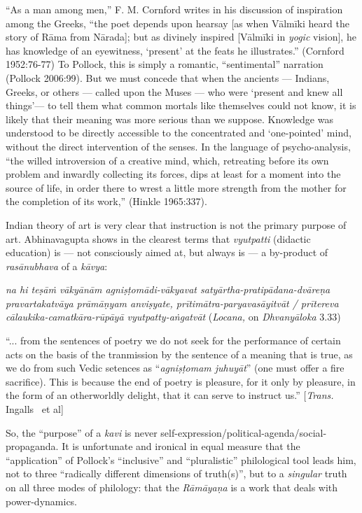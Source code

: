 “As a man among men,” F. M. Cornford writes in his discussion of inspiration among the Greeks, “the poet depends upon hearsay [as when Vālmīki heard the story of Rāma from Nārada]; but as divinely inspired [Vālmīki in {\sl yogic} vision], he has knowledge of an eyewitness, ‘present’ at the feats he illustrates.” (Cornford 1952:76-77) To Pollock, this is simply a romantic, “sentimental” narration (Pollock 2006:99). But we must concede that when the ancients — Indians, Greeks, or others — called upon the Muses — who were ‘present and knew all things’— to tell them what common mortals like themselves could not know, it is likely that their meaning was more serious than we suppose. Knowledge was understood to be directly accessible to the concentrated and ‘one-pointed’ mind, without the direct intervention of the senses. In the language of psycho-analysis,  “the willed introversion of a creative mind, which, retreating before its own problem and inwardly collecting its forces, dips at least for a moment into the source of life, in order there to wrest a little more strength from the mother for the completion of its work,” (Hinkle 1965:337). 

Indian theory of art is very clear that instruction is not the primary purpose of art. Abhinavagupta shows in the clearest terms that {\sl vyutpatti} (didactic education) is — not consciously aimed at, but always is — a by-product of {\sl rasānubhava} of a {\sl kāvya}:

\begin{myquote}
{{\sl na hi teṣāṁ vākyānām agniṣṭomādi-vākyavat satyārtha-pratipādana-dvāreṇa pravartakatvāya prāmāṇyam anviṣyate, prītimātra-paryavasāyitvāt / prītereva cālaukika-camatkāra-rūpāyā vyutpatty-aṅgatvāt}} ({\sl Locana,} on {\sl Dhvanyāloka} 3.33)

 “... from the sentences of poetry we do not seek for the performance of certain acts on the basis of the tranmission by the sentence of a meaning that is true, as we do from such Vedic setences as “{\sl agniṣṭomam juhuyāt}” (one must offer a fire sacrifice). This is because the end of poetry is pleasure, for it only by pleasure, in the form of an otherworldly delight, that it can serve to instruct us.”
\hfill  [{\sl Trans.} Ingalls~ et al]
\end{myquote}

So, the “purpose” of a {\sl kavi} is never self-expression/political-agenda/\-social-propaganda. It is unfortunate and ironical in equal measure that the “application” of Pollock’s “inclusive” and “pluralistic” philological tool leads him, not to three “radically different dimensions of truth(s)”, but to a {\sl singular} truth on all three modes of philology: that the {\sl Rāmāyaṇa} is a work that deals with power-dynamics. 

